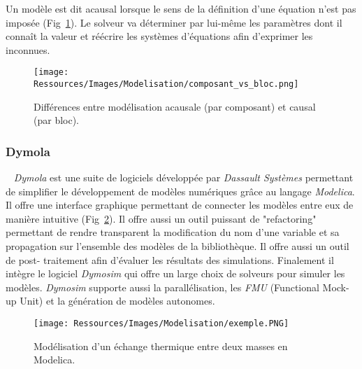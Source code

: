 \begin{Def}[Acausale]\label{def:acausal}
Un modèle est dit acausal lorsque le sens de la définition d’une équation n’est pas
imposée (Fig~\ref{fig:acausal_vs_causal}). Le solveur va déterminer par lui-même les
paramètres dont il connaît la valeur et réécrire les systèmes d’équations afin d’exprimer
les inconnues.
\end{Def}

\begin{figure}
    \begin{center}
        \texttt{[image: Ressources/Images/Modelisation/composant\_vs\_bloc.png]}
    \end{center}
    \caption{Différences entre modélisation acausale (par composant) et causal (par bloc).
             \label{fig:acausal_vs_causal}}
\end{figure}

\subsubsection{Dymola} %
\label{ssub:dymola}
~
\textit{Dymola} est une suite de logiciels développée par \textit{Dassault Systèmes}
permettant de simplifier le développement de modèles numériques grâce au langage
\textit{Modelica}. Il offre une interface graphique permettant de connecter les modèles
entre eux de manière intuitive (Fig~\ref{fig:exemple_modelica}). Il offre aussi un outil
puissant de "refactoring" permettant de rendre transparent la modification du nom d’une
variable et sa propagation sur l’ensemble des modèles de la bibliothèque. Il offre aussi
un outil de post- traitement afin d’évaluer les résultats des simulations. Finalement il
intègre le logiciel \textit{Dymosim} qui offre un large choix de solveurs pour simuler les
modèles. \textit{Dymosim} supporte aussi la parallélisation, les \emph{FMU}
(Functional Mock-up Unit) et la génération de modèles autonomes.
\begin{figure}
    \begin{center}
        \texttt{[image: Ressources/Images/Modelisation/exemple.PNG]}
    \end{center}
    \caption{Modélisation d’un échange thermique entre deux masses en Modelica.
             \label{fig:exemple_modelica}}
\end{figure}




